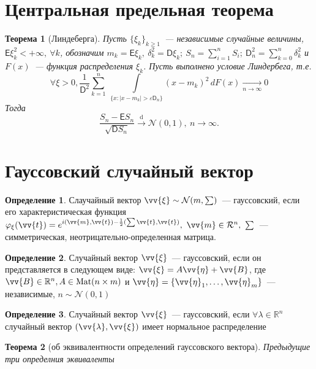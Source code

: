 \documentclass[11pt, a5paper]{article}
\DeclareMathOperator{\mat}{Mat}
\newtheorem{theorem}{Теорема}[section]
\theoremstyle{definition}\newtheorem{definition}{Определение}
\begin{document}
\section{Центральная предельная теорема}
	\begin{theorem}[Линдеберга]
	 Пусть $\{\xi_k\}_{k \geqslant 1}$~--- независимые случайные величины, $\mathsf{E} \xi_k^2 <+ \infty,~\forall k$, обозначим $m_k=\mathsf{E} \xi_k,~\delta_k^2=\mathsf{D} \xi_k;~S_n=\sum\limits_{i=1}^{n}S_i;~\mathsf{D}_n^2 = \sum\limits_{k=0}^{n}\delta_k^2$ и $F(x)$~--- функция распределения $\xi_k$. Пусть выполнено условие Линдербега, т.е.
	 $$\forall\xi>0,\frac{1}{\mathsf{D}^2}\sum\limits_{k=1}^{n}~ \int\limits_{\{x:\mid x-m_k\mid >\varepsilon \mathsf{D}_n\}} (x-m_k)^2\,dF(x) \xrightarrow[n \rightarrow \infty]{} 0 $$
	 Тогда  $$ \frac{S_n-\mathsf{E}S_n}{\sqrt{\mathsf{D}S_n}}\overset{\text{d}}{\longrightarrow} \mathcal{N} (0,1),~n \rightarrow \infty.$$
	\end{theorem}
	\section{Гауссовский случайный вектор}
	\begin{definition}
Слаучайный вектор $\vv{\xi} \sim \mathcal{N}(m,\sum)$~--- гауссовский, если его характеристическая функция $\varphi_\xi(\vv{t})=e^{i(\vv{m},\vv{t}) -\frac{1}{2}(\sum\vv{t},\vv{t})},~\vv{m} \in \mathcal{R}^n,~\sum$~--- симметрическая, неотрицательно-определенная матрица.
	\end{definition}
	\begin{definition}
Случайный вектор $\vv{\xi}$~--- гауссовский, если он представляется в следующем виде: $\vv{\xi} = A\vv{\eta} + \vv{B}$, где $\vv{B} \in \mathbb{R}^n,A \in \mat (n\times m)$ и $\vv{\eta} = \{\vv{\eta}_1, \ldots,\vv{\eta}_m \}$~--- независимые, $n \sim \mathcal{N}(0,1)$
	\end{definition}
	\begin{definition}
Случайный вектор $\vv{\xi}$~--- гауссовский, если $\forall \lambda \in \mathbb{R}^n$ случайный вектор $(\vv{\lambda}, \vv{\xi})$ имеет нормальное распределение
	\end{definition}
	\begin{theorem}[об эквивалентности определений гауссовского вектора]
		Предыдущие три определния эквиваленты
	\end{theorem}
\end{document}
